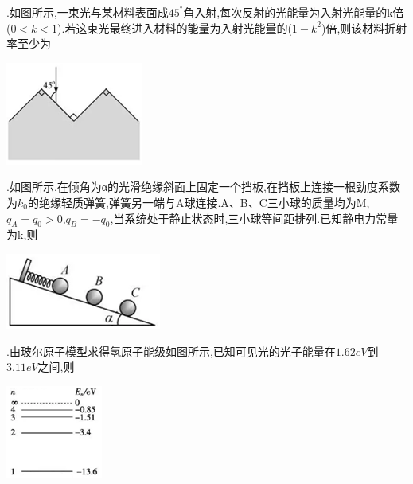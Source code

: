 \question[6].如图所示,一束光与某材料表面成$45^°$角入射,每次反射的光能量为入射光能量的k倍($0<k<1$).若这束光最终进入材料的能量为入射光能量的($1-k^2$)倍,则该材料折射率至少为\key{}\begin{center}\includegraphics[]{img/image9.png}\end{center}
\begin{solution}{4cm}

\end{solution}



\question[6].如图所示,在倾角为α的光滑绝缘斜面上固定一个挡板,在挡板上连接一根劲度系数为$k_0$的绝缘轻质弹簧,弹簧另一端与A球连接.A、B、C三小球的质量均为M,$q_A=q_0>0$,$q_B=-q_0$,当系统处于静止状态时,三小球等间距排列.已知静电力常量为k,则\key{}\begin{center}\includegraphics[]{img/image10.png}\end{center}
\begin{solution}{4cm}

\end{solution}



\question[6].由玻尔原子模型求得氢原子能级如图所示,已知可见光的光子能量在$1.62eV$到$3.11eV$之间,则\key{}\begin{center}\includegraphics[]{img/image11.png}\end{center}
\begin{solution}{4cm}

\end{solution}



